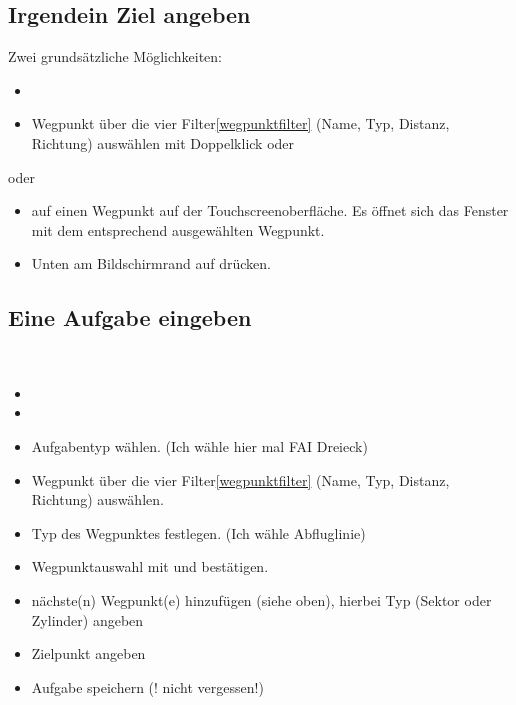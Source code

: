 \subsection{Irgendein Ziel angeben}\label{Irgendeinzieleingeben}
Zwei grundsätzliche Möglichkeiten:

\begin{itemize}
\item {}\blink~\blink~
\item Wegpunkt über die vier Filter\ref{wegpunktfilter} (Name, Typ, Distanz, Richtung) auswählen mit Doppelklick oder  \blink~
\end{itemize}

oder

\begin{itemize}
\item \dklick auf einen Wegpunkt auf der Touchscreenoberfläche. Es öffnet sich das Fenster  mit dem entsprechend ausgewählten Wegpunkt.
\item Unten am Bildschirmrand auf  drücken.
\end{itemize}


\subsection{Eine Aufgabe eingeben}\label{aufgabeeingeben}
\blink~\blink~
\begin{itemize}
\item {}
\item {}
\item Aufgabentyp wählen. (Ich wähle hier mal \textsf{FAI Dreieck})
\item {} Wegpunkt über die vier Filter\ref{wegpunktfilter} (Name, Typ, Distanz, Richtung) auswählen.
\item Typ des Wegpunktes festlegen. (Ich wähle \textsf{Abfluglinie})
\item Wegpunktauswahl  mit   und  bestätigen.
\item nächste(n) Wegpunkt(e) hinzufügen (siehe oben), hierbei Typ (Sektor oder Zylinder) angeben
\item Zielpunkt angeben
\item Aufgabe speichern (! nicht vergessen!)
\end{itemize}

